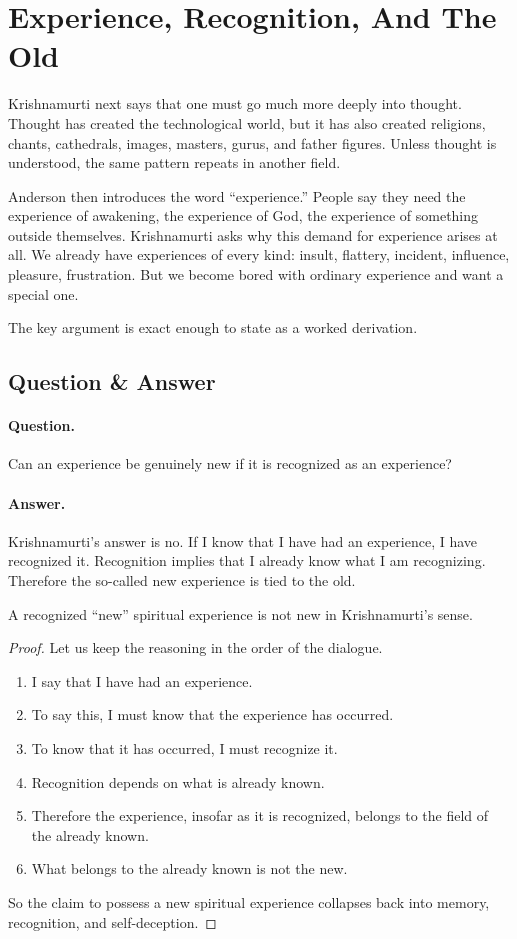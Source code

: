 \section{Experience, Recognition, And The Old}

Krishnamurti next says that one must go much more deeply into thought. Thought has created the technological world, but it has also created religions, chants, cathedrals, images, masters, gurus, and father figures. Unless thought is understood, the same pattern repeats in another field.

Anderson then introduces the word ``experience.'' People say they need the experience of awakening, the experience of God, the experience of something outside themselves. Krishnamurti asks why this demand for experience arises at all. We already have experiences of every kind: insult, flattery, incident, influence, pleasure, frustration. But we become bored with ordinary experience and want a special one.

The key argument is exact enough to state as a worked derivation.

\subsection{Question \& Answer}

\paragraph{Question.}
Can an experience be genuinely new if it is recognized as an experience?

\paragraph{Answer.}
Krishnamurti's answer is no. If I know that I have had an experience, I have recognized it. Recognition implies that I already know what I am recognizing. Therefore the so-called new experience is tied to the old.

\begin{proposition}
A recognized ``new'' spiritual experience is not new in Krishnamurti's sense.
\end{proposition}

\begin{proof}
Let us keep the reasoning in the order of the dialogue.
\begin{enumerate}
\item I say that I have had an experience.
\item To say this, I must know that the experience has occurred.
\item To know that it has occurred, I must recognize it.
\item Recognition depends on what is already known.
\item Therefore the experience, insofar as it is recognized, belongs to the field of the already known.
\item What belongs to the already known is not the new.
\end{enumerate}
So the claim to possess a new spiritual experience collapses back into memory, recognition, and self-deception.
\end{proof}

